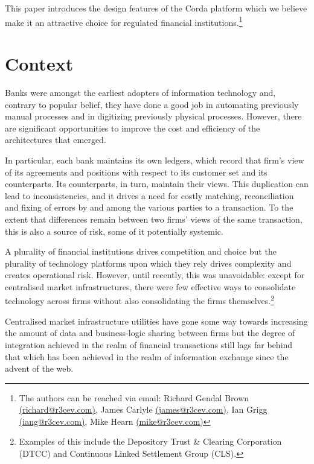 \documentclass{article}
\begin{document}
This paper introduces the design features of the Corda platform which we believe make it an attractive choice for regulated financial institutions.\footnote{The authors can be reached via email: Richard Gendal Brown \href{mailto:richard@r3cev.com}{(richard@r3cev.com)}, James Carlyle \href{mailto:james@r3cev.com}{(james@r3cev.com)}, Ian Grigg \href{mailto:iang@r3cev.com}{(iang@r3cev.com)}, Mike Hearn \href{mailto:mike@r3cev.com}{(mike@r3cev.com)}}

\section{Context}
Banks were amongst the earliest adopters of information technology and, contrary to popular belief, they have done a good job in automating previously manual processes and in digitizing previously physical processes. However, there are significant opportunities to improve the cost and efficiency of the architectures that emerged. 

In particular, each bank maintains its own ledgers, which record that firm's view of its agreements and positions with respect to its customer set and its counterparts. Its counterparts, in turn, maintain their views. This duplication can lead to inconsistencies, and it drives a need for costly matching, reconciliation and fixing of errors by and among the various parties to a transaction. To the extent that differences remain between two firms' views of the same transaction, this is also a source of risk, some of it potentially systemic.

A plurality of financial institutions drives competition and choice but the plurality of technology platforms upon which they rely drives complexity and creates operational risk. However, until recently, this was unavoidable: except for centralised market infrastructures, there were few effective ways to consolidate technology across firms without also consolidating the firms themselves.\footnote{Examples of this include the Depository Trust \& Clearing Corporation (DTCC) and Continuous Linked Settlement Group (CLS).}

Centralised market infrastructure utilities have gone some way towards increasing the amount of data and business-logic sharing between firms but the degree of integration achieved in the realm of financial transactions still lags far behind that which has been achieved in the realm of information exchange since the advent of the web. \cite{IT}
\end{document}
